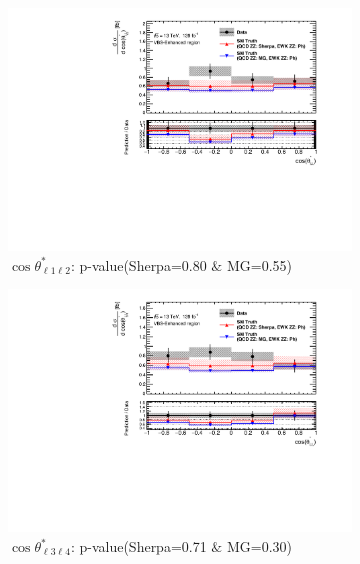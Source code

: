 \begin{figure}[!htb]
    \centering
    \begin{subfigure}{.49\textwidth}
        \centering
        \includegraphics[width=.98\linewidth]{figures/Results/CrossSection_VBSEnhanced/xs_cosThetaStar1_SR.pdf}
        \caption{ \footnotesize{$\cos \theta^{*}_{\ell 1 \ell 2}$: p-value(Sherpa=0.80 $\&$ MG=0.55)}}
    \end{subfigure}
    \begin{subfigure}{.49\textwidth}
        \centering
        \includegraphics[width=.98\linewidth]{figures/Results/CrossSection_VBSEnhanced/xs_cosThetaStar3_SR.pdf}
        \caption{ \footnotesize{$\cos \theta^{*}_{\ell 3 \ell 4}$: p-value(Sherpa=0.71 $\&$ MG=0.30)} }
    \end{subfigure}\\
    \begin{subfigure}{.49\textwidth}

\end{subfigure}
\end{figure}
